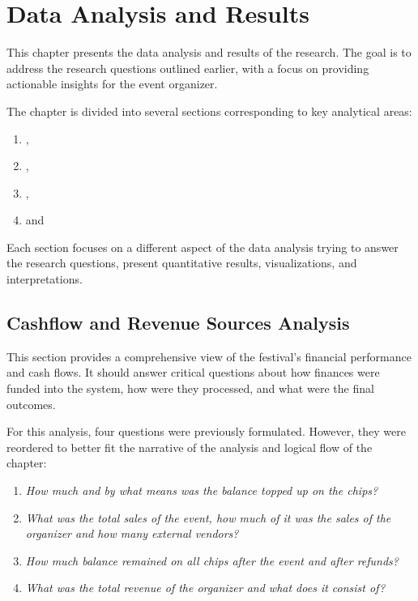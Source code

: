 \chapter{Data Analysis and Results}
\label{ch:data-analysis-and-results}

This chapter presents the data analysis and results of the research.
The goal is to address the research questions outlined earlier, with a focus on providing actionable insights for the event organizer.

The chapter is divided into several sections corresponding to key analytical areas:
\begin{enumerate}
	\item {},
	\item {},
	\item {},
	\item and~
\end{enumerate}

Each section focuses on a different aspect of the data analysis trying to answer the research questions, present quantitative results, visualizations, and interpretations.


\section{Cashflow and Revenue Sources Analysis}
\label{sec:analysis-cashflow-and-revenue-sources}

This section provides a comprehensive view of the festival's financial performance and cash flows.
It should answer critical questions about how finances were funded into the system, how were they processed, and what were the final outcomes.

For this analysis, four questions were previously formulated.
However, they were reordered to better fit the narrative of the analysis and logical flow of the chapter:
\begin{enumerate}
	\item \textit{How much and by what means was the balance topped up on the chips?}
	\item \textit{What was the total sales of the event, how much of it was the sales of the organizer and how many external vendors?}
	\item \textit{How much balance remained on all chips after the event and after refunds?}
	\item \textit{What was the total revenue of the organizer and what does it consist of?}
\end{enumerate}

